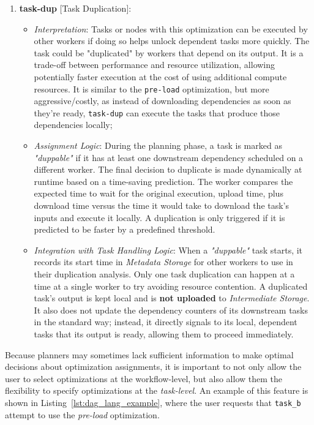 \documentclass[conference]{IEEEtran}
\begin{document}
\begin{enumerate}
\item\textbf{task-dup} [Task Duplication]:
\begin{itemize}
    \item \textit{Interpretation}: Tasks or nodes with this optimization can be executed by other workers if doing so helps unlock dependent tasks more quickly. The task could be "duplicated" by workers that depend on its output. It is a trade-off between performance and resource utilization, allowing potentially faster execution at the cost of using additional compute resources. It is similar to the \texttt{pre-load} optimization, but more aggressive/costly, as instead of downloading dependencies as soon as they're ready, \texttt{task-dup} can execute the tasks that produce those dependencies locally;
    \item \textit{Assignment Logic}: During the planning phase, a task is marked as \textit{"duppable"} if it has at least one downstream dependency scheduled on a different worker. The final decision to duplicate is made dynamically at runtime based on a time-saving prediction. The worker compares the expected time to wait for the original execution, upload time, plus download time versus the time it would take to download the task's inputs and execute it locally. A duplication is only triggered if it is predicted to be faster by a predefined threshold.
    \item \textit{Integration with Task Handling Logic}: When a \textit{"duppable"} task starts, it records its start time in \textit{Metadata Storage} for other workers to use in their duplication analysis. Only one task duplication can happen at a time at a single worker to try avoiding resource contention. A duplicated task's output is kept local and is \textbf{not uploaded} to \textit{Intermediate Storage}. It also does not update the dependency counters of its downstream tasks in the standard way; instead, it directly signals to its local, dependent tasks that its output is ready, allowing them to proceed immediately.
\end{itemize}
\end{enumerate}

Because planners may sometimes lack sufficient information to make optimal decisions about optimization assignments, it is important to not only allow the user to select optimizations at the workflow-level, but also allow them the flexibility to specify optimizations at the \textit{task-level}. An example of this feature is shown in Listing~\ref{lst:dag_lang_example}, where the user requests that \texttt{task\_b} attempt to use the \textit{pre-load} optimization.
\end{document}
